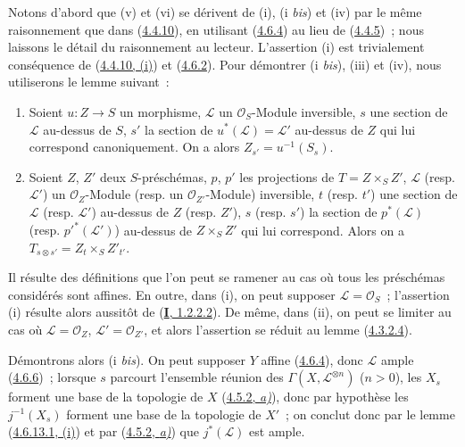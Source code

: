 Notons d'abord que (v) et (vi) se dérivent de (i), (i \emph{bis}) et (iv) par le
même raisonnement que dans (\hyperref[II.4.4.10-fr]{4.4.10}), en utilisant
(\hyperref[II.4.6.4-fr]{4.6.4}) au lieu de
(\hyperref[II.4.4.5-fr]{4.4.5})~; nous laissons le détail du raisonnement au
lecteur. L'assertion (i) est trivialement conséquence de
(\hyperref[II.4.4.10-fr]{4.4.10, (i)}) et
(\hyperref[II.4.6.2-fr]{4.6.2}). Pour démontrer (i \emph{bis}), (iii) et (iv), nous
utiliserons le lemme suivant~:

\begin{lemma}[4.6.13.1]
\label{II.4.6.13.1-fr}
\begin{enumerate}
  \item[\rm{(i)}] Soient $u:Z\to S$ un morphisme, $\mathcal{L}$ un
  $\mathcal{O}_S$-Module inversible, $s$ une section de $\mathcal{L}$
  au-dessus de $S$, $s'$ la section de $u^*(\mathcal{L})=\mathcal{L}'$
  au-dessus de $Z$ qui lui correspond canoniquement. On a alors
  $Z_{s'}=u^{-1}(S_s)$.
  \item[\rm{(ii)}] Soient $Z$, $Z'$ deux $S$-préschémas, $p$, $p'$ les
  projections de $T=Z\times_S Z'$, $\mathcal{L}$ \textup{(resp.
  $\mathcal{L}'$)} un $\mathcal{O}_Z$-Module \textup{(resp.} un
  $\mathcal{O}_{Z'}$-Module\textup{)} inversible, $t$ \textup{(resp. $t'$)} une section de
  $\mathcal{L}$ \textup{(resp. $\mathcal{L}'$)} au-dessus de $Z$ \textup{(resp. $Z'$)}, $s$
  \textup{(resp. $s'$)} la section de $p^*(\mathcal{L})$ \textup{(resp.
  $p'^*(\mathcal{L}')$)} au-dessus de $Z\times_S Z'$ qui lui correspond.
  Alors on a $T_{s\otimes s'}=Z_t\times_S Z'_{t'}$.
\end{enumerate}
\end{lemma}

Il résulte des définitions que l'on peut se ramener au cas où tous les
préschémas considérés sont affines. En outre, dans (i), on peut supposer
$\mathcal{L}=\mathcal{O}_S$~; l'assertion (i) résulte alors aussitôt de
(\hyperref[I.1.2.2.2-fr]{\textbf{I}, 1.2.2.2}). De même, dans (ii), on peut se
limiter au cas où $\mathcal{L}=\mathcal{O}_Z$,
$\mathcal{L}'=\mathcal{O}_{Z'}$, et alors l'assertion se réduit au lemme
(\hyperref[II.4.3.2.4-fr]{4.3.2.4}).

Démontrons alors (i \emph{bis}). On peut supposer $Y$ affine
(\hyperref[II.4.6.4-fr]{4.6.4}), donc $\mathcal{L}$ ample
(\hyperref[II.4.6.6-fr]{4.6.6})~; lorsque $s$ parcourt l'ensemble réunion
des $\Gamma(X,\mathcal{L}^{\otimes n})$ ($n>0$), les $X_s$ forment une
base de la topologie de $X$ (\hyperref[II.4.5.2-fr]{4.5.2, \emph{a)}}), donc par
hypothèse les $j^{-1}(X_s)$ forment une base de la topologie de $X'$~; on
conclut donc par le lemme
(\hyperref[II.4.6.13.1-fr]{4.6.13.1, (i)}) et par
(\hyperref[II.4.5.2-fr]{4.5.2, \emph{a)}}) que $j^*(\mathcal{L})$ est ample.

